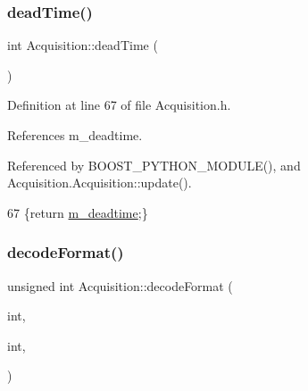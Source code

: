 \subsubsection{\texorpdfstring{dead\+Time()}{deadTime()}\hspace{0.1cm}{\footnotesize\ttfamily [2/2]}}
{\footnotesize\ttfamily int Acquisition\+::dead\+Time (\begin{DoxyParamCaption}{ }\end{DoxyParamCaption})\hspace{0.3cm}{\ttfamily [inline]}}



Definition at line 67 of file Acquisition.\+h.



References m\+\_\+deadtime.



Referenced by B\+O\+O\+S\+T\+\_\+\+P\+Y\+T\+H\+O\+N\+\_\+\+M\+O\+D\+U\+L\+E(), and Acquisition.\+Acquisition\+::update().


\begin{DoxyCode}
67 \{\textcolor{keywordflow}{return} \hyperlink{classAcquisition_a5f7fe20506e7d860ed61935255adfe17}{m\_deadtime};\}
\end{DoxyCode}
\mbox{\label{classAcquisition_a76fe7c020f7097e5d479867ba783ba31}} 
\subsubsection{\texorpdfstring{decode\+Format()}{decodeFormat()}\hspace{0.1cm}{\footnotesize\ttfamily [1/2]}}
{\footnotesize\ttfamily unsigned int Acquisition\+::decode\+Format (\begin{DoxyParamCaption}\item[{unsigned}]{int,  }\item[{unsigned}]{int,  }\item[{\hyperlink{classRAM}{R\+AM} $\ast$}]{ }\end{DoxyParamCaption})\hspace{0.3cm}{\ttfamily [protected]}}

\mbox{\label{classAcquisition_a76fe7c020f7097e5d479867ba783ba31}} 
